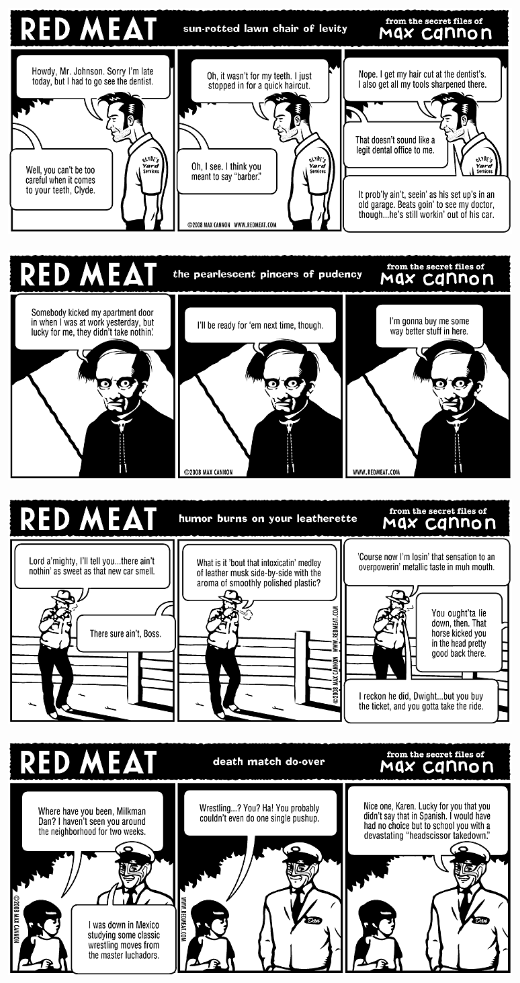 \documentclass[a4paper,twoside,11pt]{article}
\begin{document}
\includegraphics[width=\textwidth]{redmeat_2008-02-12.png}



\includegraphics[width=\textwidth]{redmeat_2008-02-19.png}



\includegraphics[width=\textwidth]{redmeat_2008-02-26.png}



\includegraphics[width=\textwidth]{redmeat_2008-03-04.png}
\end{document}
